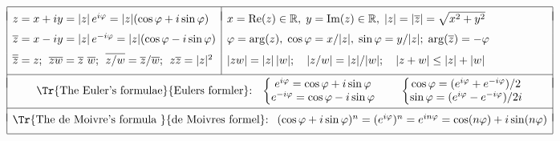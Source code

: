 \documentclass{article}
\begin{document}
$  %
\begin{array}{|l|l|}
  \hline & \\*[-8pt]
  z=x+iy    =|z|\,e^{ i\varphi}=|z|(\cos\varphi+i\sin\varphi) &
 x=\text{Re}(z)\in\Rone,\;
 y=\text{Im}(z)\in\Rone,\;
 |z| = |\ob z| = \sqrt{x^2+y^2}
  \EndRow
  \ob z=x-iy=|z|\,e^{-i\varphi}=|z|(\cos\varphi-i\sin\varphi) &
  \varphi = \arg (z),
  \;
  \cos\varphi = x/|z|,
  \;
  \sin\varphi = y/|z|  ;
  \;
  \arg(\ob z) = -\varphi
  \EndRow
  \ob{\ob z} = z ;
  \;\,
  \ob{zw} = \ob z\,\,\ob w ;
  \;\,
  \ob{z / w} = \ob z/\ob w ;
  \;\,
  z\ob z = |z|^2
  &
  |zw| = |z|\,|w| ;
  \quad
  |z/w| = |z|/|w| ;
  \quad
  |z+w| \le |z| + |w|
  \EndRow \cline{1-2} \multicolumn{2}{|l|}{}\\*[-9pt]
  \multicolumn{2}{|c|}{
    \text{\Tr{The Euler's formulae}{Eulers formler}: \ }
  \left\{\begin{matrix}
  e^{i\varphi}   =  \cos \varphi + i \sin \varphi\\
  e^{-i\varphi}  =  \cos \varphi - i \sin \varphi\\
  \end{matrix}\right.
  \hfil
  \left\{\begin{matrix}
    \cos\varphi = (e^{i\varphi}+e^{-i\varphi})/2\\
    \sin\varphi = (e^{i\varphi}-e^{-i\varphi})/2i\\
  \end{matrix}\right.
  }
  \\*[9pt]
  \cline{1-2}
  \multicolumn{2}{|l|}{}\\*[-7pt]
  \multicolumn{2}{|c|}{\text{\Tr{The de Moivre's formula }{de Moivres formel}: \ }
  (\cos\varphi+i\sin\varphi)^n
  =(e^{i\varphi})^n
  =e^{in\varphi}
  =\cos(n\varphi)+i\sin(n\varphi)
  }
  \EndRow
  \hline
\end{array}
$
\end{document}
